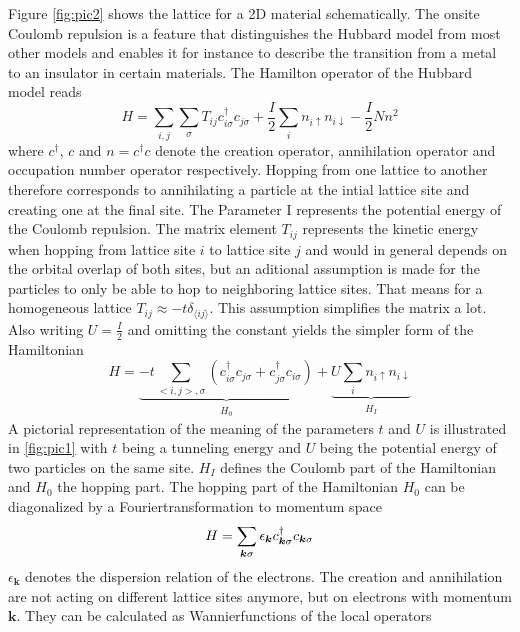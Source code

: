 Figure \ref{fig:pic2} shows the lattice for a 2D material schematically. The onsite Coulomb repulsion is a feature that distinguishes the Hubbard model from most other models and enables it for instance to describe the transition from a metal to an insulator in certain materials. The Hamilton operator of the Hubbard model reads
\begin{equation}\label{Hubbard_original}
H = \sum_{i,j}\sum_{\sigma}T_{ij} c_{i\sigma}^\dag c_{j\sigma} + \frac{I}{2} \sum_{i}n_{i\uparrow}n_{i\downarrow} - \frac{I}{2}Nn^2
\end{equation}
where $ c^\dag $,  $ c $ and $ n = c^\dag c $ denote the creation operator, annihilation operator and occupation number operator respectively. Hopping from one lattice to another therefore corresponds to annihilating a particle at the intial lattice site and creating one at the final site. The Parameter I represents the potential energy of the Coulomb repulsion. The matrix element $ T_{ij} $ represents the kinetic energy when hopping from lattice site $i$ to lattice site $j$ and would in general depends on the orbital overlap of both sites, but an aditional assumption is made for the particles to only be able to hop to neighboring lattice sites.  That means for a homogeneous lattice $ T_{ij} \approx -t\delta_{\langle ij \rangle} $. This assumption simplifies the matrix a lot. Also writing  $ U = \frac{I}{2} $ and omitting the constant yields the simpler form of the Hamiltonian
\begin{equation}\label{Hubbard_standard}
H = \underbrace{-t\sum_{< i,j>,\sigma}\left( c_{i\sigma}^\dag c_{j\sigma} + c_{j\sigma}^\dag c_{i\sigma}\right)}_{\substack{H_0}}  + \underbrace{U \sum_{i}n_{i\uparrow}n_{i\downarrow}}_{\substack{H_I}}
\end{equation}
A pictorial representation of the meaning of the parameters $ t $ and $ U $ is illustrated in \ref{fig:pic1} with $t$ being a tunneling energy and $U$ being the potential energy of two particles on the same site. 
$ H_I $ defines the Coulomb part of the Hamiltonian and $H_0$ the hopping part.
The hopping part of the Hamiltonian $H_0$ can be diagonalized by a Fouriertransformation to momentum space 
\begin{equation}\label{Hubbard_momentum}
H = \sum_{\boldsymbol{k} \sigma} \epsilon_{\boldsymbol{k}} c_{\boldsymbol{k}\sigma}^\dag c_{\boldsymbol{k}\sigma}\\
\end{equation}
$ \epsilon_{\boldsymbol{k}} $ denotes the dispersion relation of the electrons. The creation and annihilation are not acting on different lattice sites anymore, but on electrons with momentum $ \boldsymbol{k} $. They can be calculated as Wannierfunctions of the local operators
